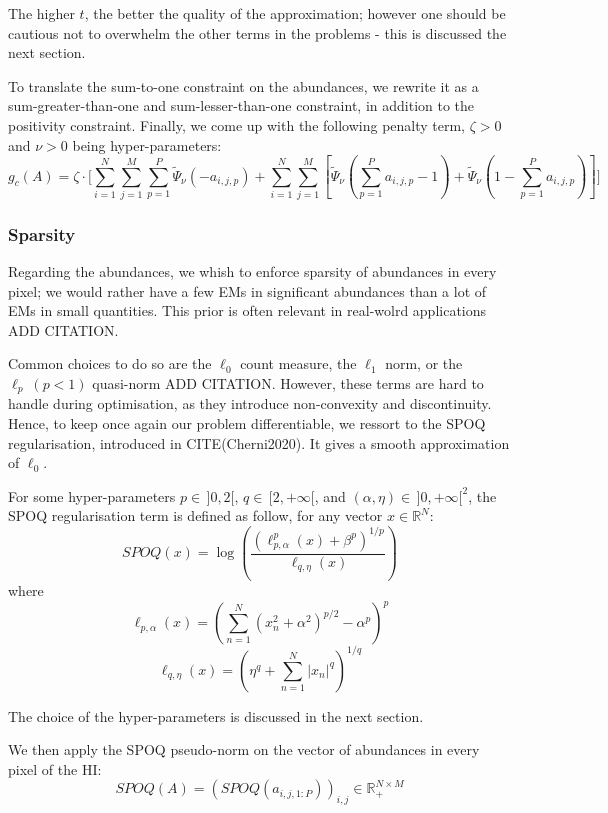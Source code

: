 \documentclass{article}
\begin{document}
The higher $t$, the better the quality of the approximation; however one should be cautious not to overwhelm the other terms in the problems - this is discussed the next section.

To translate the sum-to-one constraint on the abundances, we rewrite it as a sum-greater-than-one and sum-lesser-than-one constraint, in addition to the positivity constraint. Finally, we come up with the following penalty term, $\zeta > 0$ and $\nu > 0$ being hyper-parameters:
\begin{equation}\label{eq:g_c}
  g_c (A) = \zeta \cdot \Bigg[ \sum_{i = 1}^N \sum_{j = 1}^M \sum_{p=1}^P \tilde\Psi_\nu (-a_{i,j,p}) + \sum_{i = 1}^N \sum_{j = 1}^M \left[ \tilde\Psi_\nu(\sum_{p=1}^P a_{i,j,p} - 1) + \tilde\Psi_\nu(1 - \sum_{p=1}^Pa_{i,j,p}) \right] \Bigg]
\end{equation}

\subsubsection{Sparsity}

Regarding the abundances, we whish to enforce sparsity of abundances in every pixel; we would rather have a few EMs in significant abundances than a lot of EMs in small quantities. This prior is often relevant in real-wolrd applications ADD CITATION.

Common choices to do so are the $\ell_0$ count measure, the $\ell_1$ norm, or the $\ell_p \ (p<1)$ quasi-norm ADD CITATION. However, these terms are hard to handle during optimisation, as they introduce non-convexity and discontinuity. Hence, to keep once again our problem differentiable, we ressort to the SPOQ regularisation, introduced in CITE(Cherni2020). It gives a smooth approximation of $\ell_0$.

For some hyper-parameters $p\in \, ]0, 2[$, $q\in \, [2, +\infty[$, and $(\alpha, \eta) \in \, ]0, +\infty [^2$, the SPOQ regularisation term is defined as follow, for any vector $x \in \mathbb{R}^N$:
$$SPOQ(x) = \log \left( \frac{(\ell_{p,\alpha}^p (x) + \beta^p)^{1/p}}{\ell_{q,\eta} (x)} \right)$$
        where
        $$\ell_{p,\alpha} (x) = \left( \sum_{n=1}^N (x_n^2 + \alpha^2)^{p/2} - \alpha^p \right)^p$$
        $$\ell_{q,\eta} (x) = \left( \eta^q + \sum_{n=1}^N |x_n|^q \right)^{1/q}$$

The choice of the hyper-parameters is discussed in the next section.

We then apply the SPOQ pseudo-norm on the vector of abundances in every pixel of the HI:
$$SPOQ(A) = (SPOQ(a_{i,j,1:P}))_{i, j} \in \mathbb{R}_+^{N \times M}$$
\end{document}
